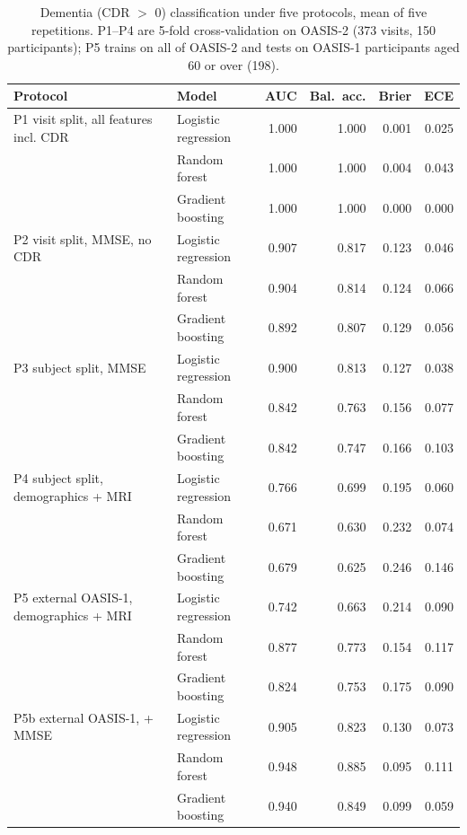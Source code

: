 \begin{table}[t]
\centering
\caption{Dementia (CDR $>$ 0) classification under five protocols, mean of five repetitions. P1--P4 are 5-fold cross-validation on OASIS-2 (373 visits, 150 participants); P5 trains on all of OASIS-2 and tests on OASIS-1 participants aged 60 or over (198).}
\label{tab:protocols}
\small
\begin{tabular}{llrrrr}
\toprule
Protocol & Model & AUC & Bal.\ acc. & Brier & ECE \\
\midrule
P1 visit split, all features incl. CDR & Logistic regression & 1.000 & 1.000 & 0.001 & 0.025 \\
 & Random forest & 1.000 & 1.000 & 0.004 & 0.043 \\
 & Gradient boosting & 1.000 & 1.000 & 0.000 & 0.000 \\
P2 visit split, MMSE, no CDR & Logistic regression & 0.907 & 0.817 & 0.123 & 0.046 \\
 & Random forest & 0.904 & 0.814 & 0.124 & 0.066 \\
 & Gradient boosting & 0.892 & 0.807 & 0.129 & 0.056 \\
P3 subject split, MMSE & Logistic regression & 0.900 & 0.813 & 0.127 & 0.038 \\
 & Random forest & 0.842 & 0.763 & 0.156 & 0.077 \\
 & Gradient boosting & 0.842 & 0.747 & 0.166 & 0.103 \\
P4 subject split, demographics + MRI & Logistic regression & 0.766 & 0.699 & 0.195 & 0.060 \\
 & Random forest & 0.671 & 0.630 & 0.232 & 0.074 \\
 & Gradient boosting & 0.679 & 0.625 & 0.246 & 0.146 \\
P5 external OASIS-1, demographics + MRI & Logistic regression & 0.742 & 0.663 & 0.214 & 0.090 \\
 & Random forest & 0.877 & 0.773 & 0.154 & 0.117 \\
 & Gradient boosting & 0.824 & 0.753 & 0.175 & 0.090 \\
P5b external OASIS-1, + MMSE & Logistic regression & 0.905 & 0.823 & 0.130 & 0.073 \\
 & Random forest & 0.948 & 0.885 & 0.095 & 0.111 \\
 & Gradient boosting & 0.940 & 0.849 & 0.099 & 0.059 \\
\bottomrule
\end{tabular}
\end{table}
